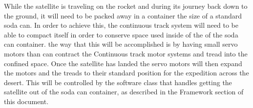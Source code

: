 \documentclass[10pt,letterpaper,onecolumn,journal]{IEEEtran}
\begin{document}
While the satellite is traveling on the rocket and during its journey back down to the ground, it will need to be packed away in a container the size of a standard soda can. In order to achieve this, the continuous track system will need to be able to compact itself in order to conserve space used inside of the of the soda can container. the way that this will be accomplished is by having small servo motors than can contract the Continuous track motor systems and tread into the confined space. Once the satellite has landed the servo motors will then expand the motors and the treads to their standard position for the expedition across the desert. This will be controlled by the software class that handles getting the satellite out of the soda can container, as described in the Framework section of this document.\vspace{.3cm}
\par
\end{document}

